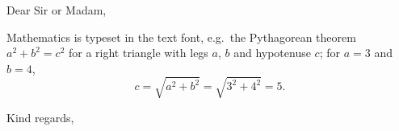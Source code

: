 \documentclass[ENlocalization, DElogo, calibri, pageNumbersMofN]{mul-letter}
\begin{document}

\subject{Subject}

Dear Sir or Madam,

\lipsum[1-3]

Mathematics is typeset in the text font, e.g.\ the Pythagorean theorem
$a^2 + b^2 = c^2$ for a right triangle with legs $a$, $b$ and hypotenuse $c$;
for $a = 3$ and $b = 4$,
\[
  c = \sqrt{a^2 + b^2} = \sqrt{3^2 + 4^2} = 5.
\]

\lipsum[4-6]

\closing{Kind regards,}

\end{document}

